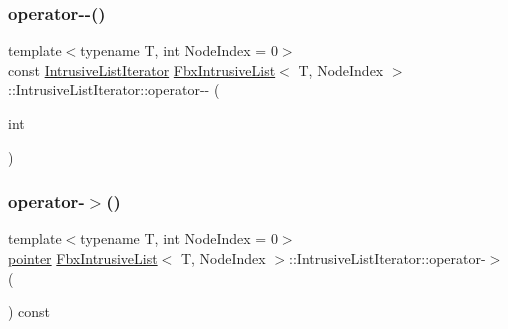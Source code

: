 \subsubsection{\texorpdfstring{operator-\/-\/()}{operator--()}\hspace{0.1cm}{\footnotesize\ttfamily [2/2]}}
{\footnotesize\ttfamily template$<$typename T, int Node\+Index = 0$>$ \\
const \hyperlink{class_fbx_intrusive_list_1_1_intrusive_list_iterator}{Intrusive\+List\+Iterator} \hyperlink{class_fbx_intrusive_list}{Fbx\+Intrusive\+List}$<$ T, Node\+Index $>$\+::Intrusive\+List\+Iterator\+::operator-\/-\/ (\begin{DoxyParamCaption}\item[{int}]{ }\end{DoxyParamCaption})}

\mbox{\label{class_fbx_intrusive_list_1_1_intrusive_list_iterator_ad699b071c709f496ca56d77c463d6a3a}} 
\subsubsection{\texorpdfstring{operator-\/$>$()}{operator->()}}
{\footnotesize\ttfamily template$<$typename T, int Node\+Index = 0$>$ \\
\hyperlink{class_fbx_intrusive_list_ad04ad10d67ddd0d4104b172839c908d7}{pointer} \hyperlink{class_fbx_intrusive_list}{Fbx\+Intrusive\+List}$<$ T, Node\+Index $>$\+::Intrusive\+List\+Iterator\+::operator-\/$>$ (\begin{DoxyParamCaption}{ }\end{DoxyParamCaption}) const}

\mbox{\label{class_fbx_intrusive_list_1_1_intrusive_list_iterator_aea5cf4fe46c0094874ddd5ee8d356903}} 
